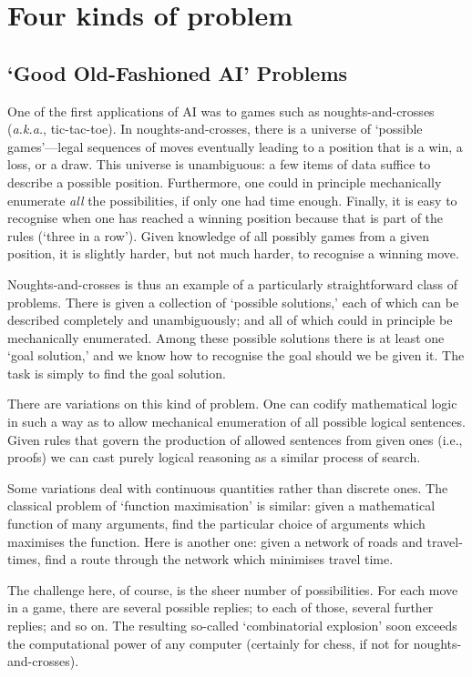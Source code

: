 \documentclass[10pt, a4paper, twocolumn]{article}
\newcommand{\ie}{i.e.\relax}
\begin{document}
\section{Four kinds of problem}

\subsection{`Good Old-Fashioned AI' Problems}

One of the first applications of AI was to games such as noughts-and-crosses
(\emph{a.k.a.}, tic-tac-toe). In noughts-and-crosses, there is a universe of
`possible games'---legal sequences of moves eventually leading to a position that
is a win, a loss, or a draw. This universe is unambiguous: a few items of data
suffice to describe a possible position. Furthermore, one could in principle
mechanically enumerate \emph{all} the possibilities, if only one had time
enough. Finally, it is easy to recognise when one has reached a winning position
because that is part of the rules (`three in a row'). Given knowledge of all
possibly games from a given position, it is slightly harder, but not much
harder, to recognise a winning move.

Noughts-and-crosses is thus an example of a particularly straightforward class
of problems. There is given a collection of `possible solutions,' each of which
can be described completely and unambiguously; and all of which could in
principle be mechanically enumerated. Among these possible solutions there is at
least one `goal solution,' and we know how to recognise the goal should we be
given it. The task is simply to find the goal solution.

There are variations on this kind of problem. One can codify mathematical logic
in such a way as to allow mechanical enumeration of all possible logical
sentences. Given rules that govern the production of allowed sentences from
given ones (\ie, proofs) we can cast purely logical reasoning as a similar
process of search.

Some variations deal with continuous quantities rather than discrete ones. The
classical problem of `function maximisation' is similar: given a mathematical
function of many arguments, find the particular choice of arguments which
maximises the function. Here is another one: given a network of roads and
travel-times, find a route through the network which minimises travel time.

The challenge here, of course, is the sheer number of possibilities. For each
move in a game, there are several possible replies; to each of those, several
further replies; and so on. The resulting so-called `combinatorial explosion'
soon exceeds the computational power of any computer (certainly for chess, if
not for noughts-and-crosses).
\end{document}
